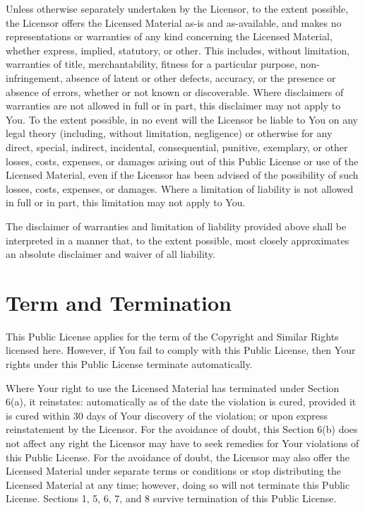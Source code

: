     Unless otherwise separately undertaken by the Licensor, to the extent possible, the Licensor offers the Licensed Material as-is and as-available, and makes no representations or warranties of any kind concerning the Licensed Material, whether express, implied, statutory, or other. This includes, without limitation, warranties of title, merchantability, fitness for a particular purpose, non-infringement, absence of latent or other defects, accuracy, or the presence or absence of errors, whether or not known or discoverable. Where disclaimers of warranties are not allowed in full or in part, this disclaimer may not apply to You.
    To the extent possible, in no event will the Licensor be liable to You on any legal theory (including, without limitation, negligence) or otherwise for any direct, special, indirect, incidental, consequential, punitive, exemplary, or other losses, costs, expenses, or damages arising out of this Public License or use of the Licensed Material, even if the Licensor has been advised of the possibility of such losses, costs, expenses, or damages. Where a limitation of liability is not allowed in full or in part, this limitation may not apply to You.

    The disclaimer of warranties and limitation of liability provided above shall be interpreted in a manner that, to the extent possible, most closely approximates an absolute disclaimer and waiver of all liability.

\section*{Term and Termination}

    This Public License applies for the term of the Copyright and Similar Rights licensed here. However, if You fail to comply with this Public License, then Your rights under this Public License terminate automatically.

    Where Your right to use the Licensed Material has terminated under Section 6(a), it reinstates:
        automatically as of the date the violation is cured, provided it is cured within 30 days of Your discovery of the violation; or
        upon express reinstatement by the Licensor.
    For the avoidance of doubt, this Section 6(b) does not affect any right the Licensor may have to seek remedies for Your violations of this Public License.
    For the avoidance of doubt, the Licensor may also offer the Licensed Material under separate terms or conditions or stop distributing the Licensed Material at any time; however, doing so will not terminate this Public License.
    Sections 1, 5, 6, 7, and 8 survive termination of this Public License.


